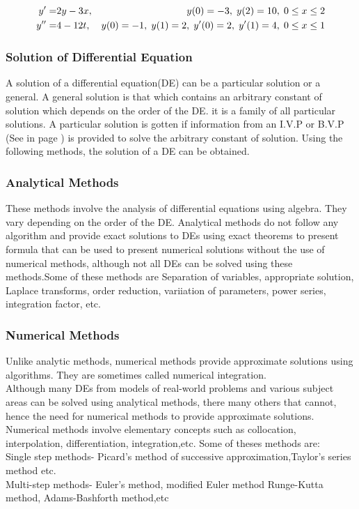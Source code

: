 \documentclass[12pt]{article}
\begin{document}
	\begin{eqnarray}
	y' =& 2y -3x,& y(0) = -3,\hspace{1mm} y(2) = 10,\hspace{1mm} 0\leq x\leq 2\\
	y'' =& 4 - 12t,& y(0) = -1,\hspace{1mm} y(1) =2,\hspace{1mm} y'(0) = 2,\hspace{1mm} y'(1) = 4,\hspace{1mm} 0\leq x\leq 1
	\end{eqnarray}
	
	\smallskip
	\subsubsection{Solution of Differential Equation}
	A solution of a differential equation(DE) can be a particular solution or a general. 
	A general solution is that which contains an arbitrary constant of solution which depends on the order of the DE. it is a family of all particular solutions. A particular solution is gotten if information from an I.V.P or B.V.P (See in page \pageref{sec: Problems of ODE}) is provided to solve the arbitrary constant of solution. Using the following methods, the solution of a DE can be obtained.
	\subsubsection*{Analytical Methods}
	These methods involve the analysis of differential equations using algebra. They vary depending on the order of the DE. Analytical methods do not follow any algorithm and provide exact solutions to DEs using exact theorems to present formula that can be used to present numerical solutions without the use of numerical methods, although not all DEs can be solved using these methods.Some of these methods are Separation of variables, appropriate solution, Laplace transforms, order reduction, variiation of parameters, power series, integration factor, etc.
	\subsubsection*{Numerical Methods}
	Unlike analytic methods, numerical methods provide approximate solutions using algorithms. They are sometimes called numerical integration. \\ Although many DEs from models of real-world problems and various subject areas can be solved using analytical methods, there many others that cannot, hence the need for numerical methods to provide approximate solutions.\\ Numerical methods involve elementary concepts such as collocation, interpolation, differentiation, integration,etc. Some of theses methods are:\\
Single step methods-  Picard's method of successive approximation,Taylor's series method etc. \\
Multi-step methods- Euler's method, modified Euler method Runge-Kutta method, Adams-Bashforth method,etc\\
	\medskip
\end{document}
